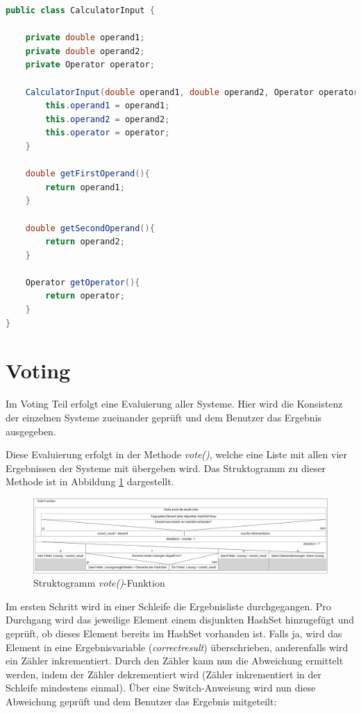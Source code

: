 \begin{lstlisting}[language=Java,basicstyle=\scriptsize, caption=CalculatorInput Klasse,label=lst:CalculatorInput]
public class CalculatorInput {

    private double operand1;
    private double operand2;
    private Operator operator;

    CalculatorInput(double operand1, double operand2, Operator operator){
        this.operand1 = operand1;
        this.operand2 = operand2;
        this.operator = operator;
    }

    double getFirstOperand(){
        return operand1;
    }

    double getSecondOperand(){
        return operand2;
    }

    Operator getOperator(){
        return operator;
    }
}
\end{lstlisting}
\section{Voting}

Im Voting Teil erfolgt eine Evaluierung aller Systeme. Hier wird die Konsistenz der einzelnen Systeme zueinander geprüft und dem Benutzer das Ergebnis ausgegeben. 

Diese Evaluierung erfolgt in der Methode \textit{vote()}, welche eine Liste mit allen vier Ergebnissen der Systeme mit übergeben wird. Das Struktogramm zu dieser Methode ist in Abbildung \ref{fig:vote} dargestellt. 

\begin{figure}[!htbp]
    \centering
    \includegraphics[width=1\linewidth]{images/vote_function_struktogramm.PNG}
    \caption{Struktogramm \textit{vote()}-Funktion}
    \label{fig:vote}
\end{figure}

 Im ersten Schritt wird in einer Schleife die Ergebnisliste durchgegangen. Pro Durchgang wird das jeweilige Element einem disjunkten HashSet hinzugefügt und geprüft, ob dieses Element bereits im HashSet vorhanden ist. Falls ja, wird das Element in eine Ergebnisvariable (\textit{correct\textunderscore result}) überschrieben, anderenfalls wird ein Zähler inkrementiert. Durch den Zähler kann nun die Abweichung ermittelt werden, indem der Zähler dekrementiert wird (Zähler inkrementiert in der Schleife mindestens einmal). Über eine Switch-Anweisung wird nun diese Abweichung geprüft und dem Benutzer das Ergebnis mitgeteilt:
 
